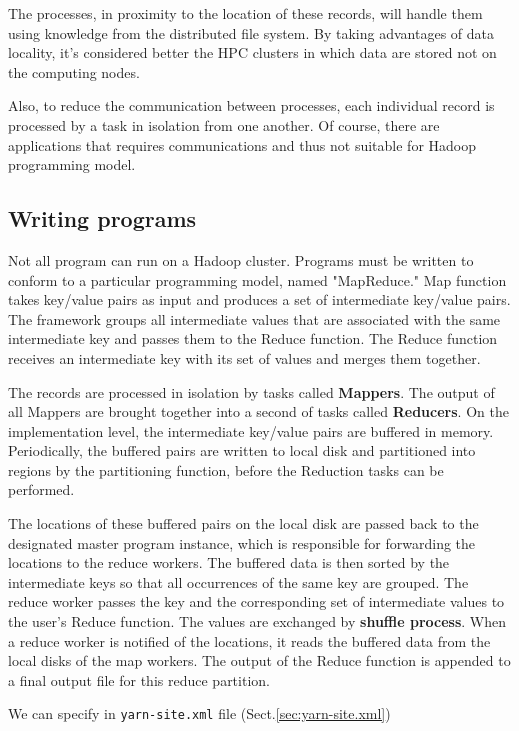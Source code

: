 The processes, in proximity to the location of these records, will handle them
using knowledge from the distributed file system. By taking advantages of data
locality, it's considered better the HPC clusters in which data are stored
not on the computing nodes.

Also, to reduce the communication between processes, each individual record is
processed by a task in isolation from one another. Of course, there are
applications that requires communications and thus not suitable for Hadoop
programming model. 

\subsection{Writing programs}

Not all program can run on a Hadoop cluster. Programs must be written to conform
to a particular programming model, named "MapReduce." Map function takes
key/value pairs as input and produces a set of intermediate key/value pairs.
The framework groups all intermediate values that are associated with the same
intermediate key and passes them to the Reduce function. The Reduce function
receives an intermediate key with its set of values and merges them together.

The records are processed in isolation by tasks called {\bf Mappers}. The output
of all Mappers are brought together into a second of tasks called {\bf
Reducers}. 
On the implementation level, the intermediate key/value pairs are buffered in
memory. Periodically, the buffered pairs are written to local disk and
partitioned into regions by the partitioning function, before the Reduction
tasks can be performed.

The locations of these buffered pairs on the local disk are passed back to the
designated master program instance, which is responsible for forwarding the
locations to the reduce workers. 
The buffered data is then sorted by the intermediate keys so that all
occurrences of the same key are grouped.
 The reduce worker passes the key and the corresponding set of intermediate
values to the user's Reduce function. The values are exchanged by {\bf shuffle
process}. When a reduce worker is notified of the locations, it reads the buffered data
from the local disks of the map workers.
The output of the Reduce function is appended to a final output file for this
reduce partition.
 
We can specify in
\verb!yarn-site.xml! file (Sect.\ref{sec:yarn-site.xml})

